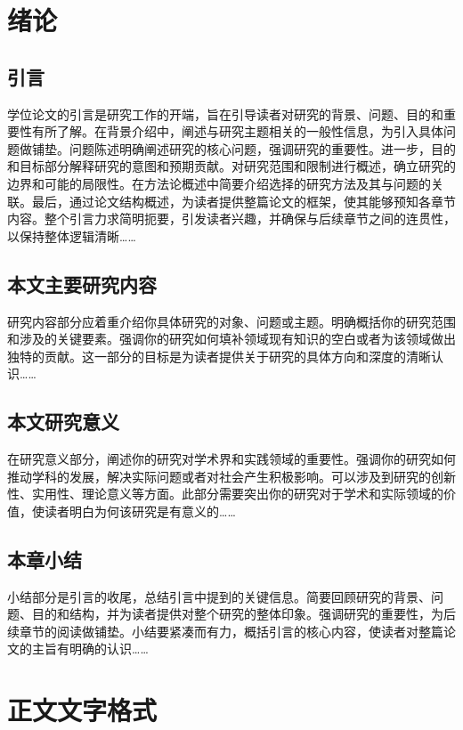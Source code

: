 \documentclass[UTF8,a4paper,12pt]{ctexart}
\numberwithin{equation}{section}
\begin{document}
\section{绪论}
\subsection{引言}
学位论文的引言是研究工作的开端，旨在引导读者对研究的背景、问题、目的和重要性有所了解。在背景介绍中，阐述与研究主题相关的一般性信息，为引入具体问题做铺垫。问题陈述明确阐述研究的核心问题，强调研究的重要性。进一步，目的和目标部分解释研究的意图和预期贡献。对研究范围和限制进行概述，确立研究的边界和可能的局限性。在方法论概述中简要介绍选择的研究方法及其与问题的关联。最后，通过论文结构概述，为读者提供整篇论文的框架，使其能够预知各章节内容。整个引言力求简明扼要，引发读者兴趣，并确保与后续章节之间的连贯性，以保持整体逻辑清晰……

\subsection{本文主要研究内容}
研究内容部分应着重介绍你具体研究的对象、问题或主题。明确概括你的研究范围和涉及的关键要素。强调你的研究如何填补领域现有知识的空白或者为该领域做出独特的贡献。这一部分的目标是为读者提供关于研究的具体方向和深度的清晰认识……

\subsection{本文研究意义}
在研究意义部分，阐述你的研究对学术界和实践领域的重要性。强调你的研究如何推动学科的发展，解决实际问题或者对社会产生积极影响。可以涉及到研究的创新性、实用性、理论意义等方面。此部分需要突出你的研究对于学术和实际领域的价值，使读者明白为何该研究是有意义的……

\subsection{本章小结}
小结部分是引言的收尾，总结引言中提到的关键信息。简要回顾研究的背景、问题、目的和结构，并为读者提供对整个研究的整体印象。强调研究的重要性，为后续章节的阅读做铺垫。小结要紧凑而有力，概括引言的核心内容，使读者对整篇论文的主旨有明确的认识……

\newpage
{}

\section{正文文字格式}
\end{document}
